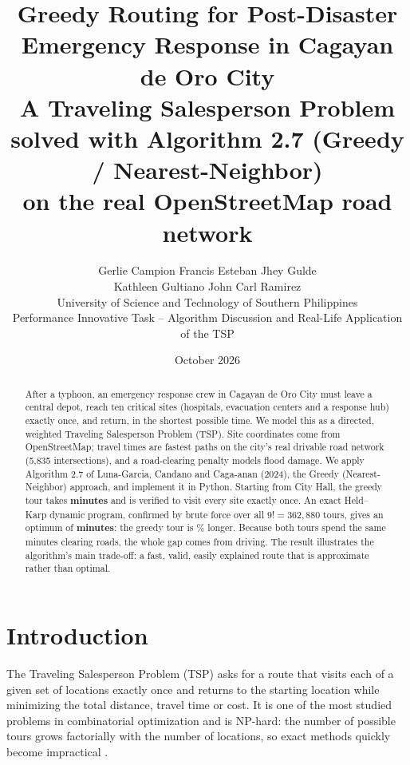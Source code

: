 \documentclass[11pt,a4paper]{article}
\title{\textbf{Greedy Routing for Post-Disaster Emergency Response in Cagayan de Oro City}\\[0.6em]
\large A Traveling Salesperson Problem solved with Algorithm 2.7 (Greedy / Nearest-Neighbor)\\ on the real OpenStreetMap road network}
\author{Gerlie Campion \quad Francis Esteban \quad Jhey Gulde\\
Kathleen Gultiano \quad John Carl Ramirez\\[0.4em]
\small University of Science and Technology of Southern Philippines\\
\small Performance Innovative Task -- Algorithm Discussion and Real-Life Application of the TSP}
\date{October 2026}
\begin{document}
\maketitle
\thispagestyle{empty}

\begin{abstract}
\noindent After a typhoon, an emergency response crew in Cagayan de Oro City must leave a central depot, reach ten critical sites (hospitals, evacuation centers and a response hub) exactly once, and return, in the shortest possible time. We model this as a directed, weighted Traveling Salesperson Problem (TSP). Site coordinates come from OpenStreetMap; travel times are fastest paths on the city's real drivable road network (5,835 intersections), and a road-clearing penalty models flood damage. We apply Algorithm 2.7 of Luna-Garcia, Candano and Caga-anan (2024), the Greedy (Nearest-Neighbor) approach, and implement it in Python. Starting from City Hall, the greedy tour takes \textbf{\GreedyTotal{} minutes} and is verified to visit every site exactly once. An exact Held--Karp dynamic program, confirmed by brute force over all $9! = 362{,}880$ tours, gives an optimum of \textbf{\OptTotal{} minutes}: the greedy tour is \GapPct\% longer. Because both tours spend the same \GreedyClear{} minutes clearing roads, the whole gap comes from driving. The result illustrates the algorithm's main trade-off: a fast, valid, easily explained route that is approximate rather than optimal.
\end{abstract}

\tableofcontents
\newpage

\section{Introduction}
The Traveling Salesperson Problem (TSP) asks for a route that visits each of a given set of locations exactly once and returns to the starting location while minimizing the total distance, travel time or cost. It is one of the most studied problems in combinatorial optimization and is NP-hard: the number of possible tours grows factorially with the number of locations, so exact methods quickly become impractical \cite{luna2024}.
\end{document}
